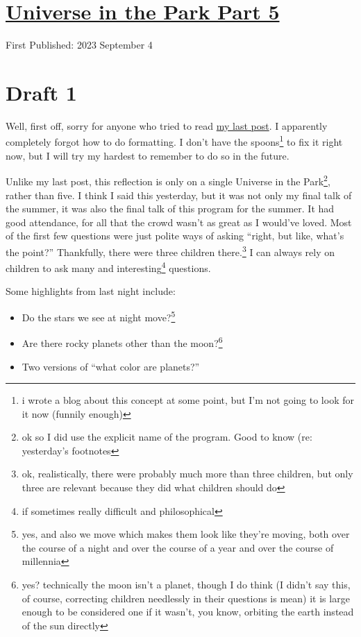 \documentclass[12pt]{article}[titlepage]
\newcommand{\say}[1]{``#1''}
\newcommand{\1}{\={a}}
\newcommand{\2}{\={e}}
\newcommand{\3}{\={\i}}
\newcommand{\4}{\=o}
\newcommand{\5}{\=u}
\newcommand{\6}{\={A}}
\renewcommand{\,}{\textsuperscript{,}}
\begin{document}
\doublespacing
\section{\href{universe-5.html}{Universe in the Park Part 5}}
First Published: 2023 September 4
\section{Draft 1}
Well, first off, sorry for anyone who tried to read \href{universe-4}{my last post}.
I apparently completely forgot how to do formatting.
I don't have the spoons\footnote{i wrote a blog about this concept at some point, but I'm not going to look for it now (funnily enough)} to fix it right now, but I will try my hardest to remember to do so in the future.

Unlike my last post, this reflection is only on a single Universe in the Park\footnote{ok so I did use the explicit name of the program. Good to know (re: yesterday's footnotes}, rather than five.
I think I said this yesterday, but it was not only my final talk of the summer, it was also the final talk of this program for the summer.
It had good attendance, for all that the crowd wasn't as great as I would've loved.
Most of the first few questions were just polite ways of asking \say{right, but like, what's the point?}
Thankfully, there were three children there.\footnote{ok, realistically, there were probably much more than three children, but only three are relevant because they did what children should do}
I can always rely on children to ask many and interesting\footnote{if sometimes really difficult and philosophical} questions.

Some highlights from last night include:
\begin{itemize}
\item Do the stars we see at night move?\footnote{yes, and also we move which makes them look like they're moving, both over the course of a night and over the course of a year and over the course of millennia}
\item Are there rocky planets other than the moon?\footnote{yes? technically the moon isn't a planet, though I do think (I didn't say this, of course, correcting children needlessly in their questions is mean) it is large enough to be considered one if it wasn't, you know, orbiting the earth instead of the sun directly}
\item Two versions of \say{what color are planets?}
\end{itemize}
\end{document}
